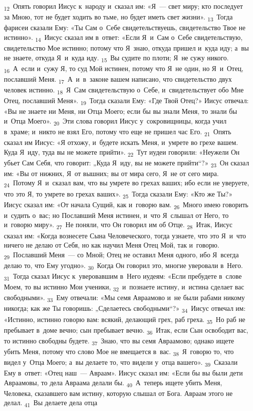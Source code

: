\documentclass[a4paper,12pt]{article}
\begin{document}
\textsubscript{12}~Опять говорил Иисус к~народу и~сказал им: «Я~--- свет миру; кто последует за Мною, тот не будет ходить во тьме, но будет иметь свет жизни». \textsubscript{13}~Тогда фарисеи сказали Ему: «Ты Сам о~Себе свидетельствуешь, свидетельство Твое не истинно». \textsubscript{14}~Иисус сказал им в~ответ: «Если Я~и~Сам о~Себе свидетельствую, свидетельство Мое истинно; потому что Я~знаю, откуда пришел и~куда иду; а~вы не знаете, откуда Я~и~куда иду. \textsubscript{15}~Вы судите по плоти; Я~не сужу никого. \textsubscript{16}~А~если и~сужу Я, то суд Мой истинен, потому что Я~не один, но Я~и~Отец, пославший Меня. \textsubscript{17}~А~и~в~законе вашем написано, что свидетельство двух человек истинно. \textsubscript{18}~Я~Сам свидетельствую о~Себе, и~свидетельствует обо Мне Отец, пославший Меня». \textsubscript{19}~Тогда сказали Ему: «Где Твой Отец?» Иисус отвечал: «Вы не знаете ни Меня, ни Отца Моего; если бы вы знали Меня, то знали бы и~Отца Моего». \textsubscript{20}~Эти слова говорил Иисус у~сокровищницы, когда учил в~храме; и~никто не взял Его, потому что еще не пришел час Его. \textsubscript{21}~Опять сказал им Иисус: «Я отхожу, и~будете искать Меня, и~умрете во грехе вашем. Куда Я~иду, туда вы не можете прийти». \textsubscript{22}~Тут иудеи говорили: «Неужели Он убьет Сам Себя, что говорит: „Куда Я~иду, вы не можете прийти“?» \textsubscript{23}~Он сказал им: «Вы от нижних, Я~от вышних; вы от мира сего, Я~не от сего мира. \textsubscript{24}~Потому Я~и~сказал вам, что вы умрете во грехах ваших; ибо если не уверуете, что это Я, то умрете во грехах ваших». \textsubscript{25}~Тогда сказали Ему: «Кто же Ты?» Иисус сказал им: «От начала Сущий, как и~говорю вам. \textsubscript{26}~Много имею говорить и~судить о~вас; но Пославший Меня истинен, и~что Я~слышал от Него, то и~говорю миру». \textsubscript{27}~Не поняли, что Он говорил им об Отце. \textsubscript{28}~Итак, Иисус сказал им: «Когда вознесете Сына Человеческого, тогда узнаете, что это Я~и~что ничего не делаю от Себя, но как научил Меня Отец Мой, так и~говорю. \textsubscript{29}~Пославший Меня~--- со Мной; Отец не оставил Меня одного, ибо Я~всегда делаю то, что Ему угодно». \textsubscript{30}~Когда Он говорил это, многие уверовали в~Него. \textsubscript{31}~Тогда сказал Иисус к~уверовавшим в~Него иудеям: «Если пребудете в~слове Моем, то вы истинно Мои ученики, \textsubscript{32}~и~познаете истину, и~истина сделает вас свободными». \textsubscript{33}~Ему отвечали: «Мы семя Авраамово и~не были рабами никому никогда; как же Ты говоришь: „Сделаетесь свободными“?» \textsubscript{34}~Иисус отвечал им: «Истинно, истинно говорю вам: всякий, делающий грех, раб греха. \textsubscript{35}~Но раб не пребывает в~доме вечно; сын пребывает вечно. \textsubscript{36}~Итак, если Сын освободит вас, то истинно свободны будете. \textsubscript{37}~Знаю, что вы семя Авраамово; однако ищете убить Меня, потому что слово Мое не вмещается в~вас. \textsubscript{38}~Я~говорю то, что видел у~Отца Моего; а~вы делаете то, что видели у~отца вашего». \textsubscript{39}~Сказали Ему в~ответ: «Отец наш~--- Авраам». Иисус сказал им: «Если бы вы были дети Авраамовы, то дела Авраама делали бы. \textsubscript{40}~А~теперь ищете убить Меня, Человека, сказавшего вам истину, которую слышал от Бога. Авраам этого не делал. \textsubscript{41}~Вы делаете дела отца 
\end{document}
